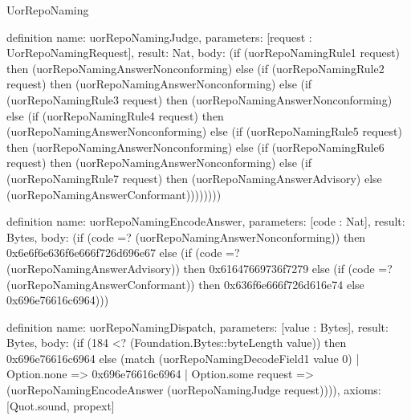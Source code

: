 \begin{lexlean}{UorRepoNaming}
\begin{semanticmodule}
definition{
  name: uorRepoNamingJudge,
  parameters: [request : UorRepoNamingRequest],
  result: Nat,
  body: (if (uorRepoNamingRule1 request) then (uorRepoNamingAnswerNonconforming) else (if (uorRepoNamingRule2 request) then (uorRepoNamingAnswerNonconforming) else (if (uorRepoNamingRule3 request) then (uorRepoNamingAnswerNonconforming) else (if (uorRepoNamingRule4 request) then (uorRepoNamingAnswerNonconforming) else (if (uorRepoNamingRule5 request) then (uorRepoNamingAnswerNonconforming) else (if (uorRepoNamingRule6 request) then (uorRepoNamingAnswerNonconforming) else (if (uorRepoNamingRule7 request) then (uorRepoNamingAnswerAdvisory) else (uorRepoNamingAnswerConformant))))))))
}

definition{
  name: uorRepoNamingEncodeAnswer,
  parameters: [code : Nat],
  result: Bytes,
  body: (if (code =? (uorRepoNamingAnswerNonconforming)) then 0x6e6f6e636f6e666f726d696e67 else (if (code =? (uorRepoNamingAnswerAdvisory)) then 0x61647669736f7279 else (if (code =? (uorRepoNamingAnswerConformant)) then 0x636f6e666f726d616e74 else 0x696e76616c6964)))
}

definition{
  name: uorRepoNamingDispatch,
  parameters: [value : Bytes],
  result: Bytes,
  body: (if (184 <? (Foundation.Bytes::byteLength value)) then 0x696e76616c6964 else (match (uorRepoNamingDecodeField1 value 0)
    | Option.none => 0x696e76616c6964
    | Option.some request => (uorRepoNamingEncodeAnswer (uorRepoNamingJudge request)))),
  axioms: [Quot.sound, propext]
}
\end{semanticmodule}
\end{lexlean}
